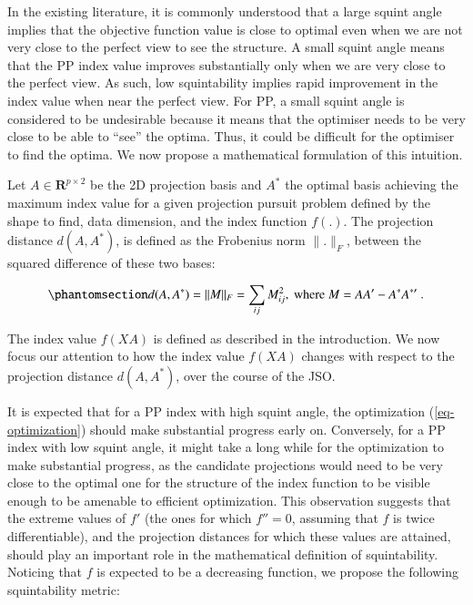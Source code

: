 \documentclass[
  number,
  preprint,
  3p]{elsarticle}
\begin{document}
In the existing literature, it is commonly understood that a large
squint angle implies that the objective function value is close to
optimal even when we are not very close to the perfect view to see the
structure. A small squint angle means that the PP index value improves
substantially only when we are very close to the perfect view. As such,
low squintability implies rapid improvement in the index value when near
the perfect view. For PP, a small squint angle is considered to be
undesirable because it means that the optimiser needs to be very close
to be able to ``see'' the optima. Thus, it could be difficult for the
optimiser to find the optima. We now propose a mathematical formulation
of this intuition.

Let \(A \in \mathbf{R}^{p \times 2}\) be the 2D projection basis and
\(A^*\) the optimal basis achieving the maximum index value for a given
projection pursuit problem defined by the shape to find, data dimension,
and the index function \(f(.)\). The projection distance \(d(A, A^*)\),
is defined as the Frobenius norm \(\lVert . \rVert _F\), between the
squared difference of these two bases:

\begin{equation}\phantomsection\label{eq-proj-dist}{d(A, A^*) = \lVert M \rVert _F = \sum_{ij} M_{ij}^2, \text{ where } M = AA^\prime - A^*A^{*\prime}\ .}\end{equation}

The index value \(f(XA)\) is defined as described in the introduction.
We now focus our attention to how the index value \(f(XA)\) changes with
respect to the projection distance \(d(A, A^*)\), over the course of the
JSO.

It is expected that for a PP index with high squint angle, the
optimization (\ref{eq-optimization}) should make substantial progress
early on. Conversely, for a PP index with low squint angle, it might
take a long while for the optimization to make substantial progress, as
the candidate projections would need to be very close to the optimal one
for the structure of the index function to be visible enough to be
amenable to efficient optimization. This observation suggests that the
extreme values of \(f'\) (the ones for which \(f''=0\), assuming that
\(f\) is twice differentiable), and the projection distances for which
these values are attained, should play an important role in the
mathematical definition of squintability. Noticing that \(f\) is
expected to be a decreasing function, we propose the following
squintability metric:
\end{document}

